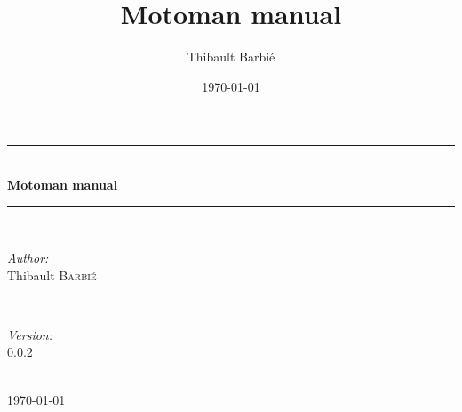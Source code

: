 \documentclass{book}
\title{Motoman manual}
\author{Thibault Barbié}
\date{\today}
\begin{document}
\begin{titlepage}
\newcommand{\HRule}{\rule{\linewidth}{0.5mm}}
\center

\HRule \\[1.5cm]
{ \huge \bfseries Motoman manual}\\[0.4cm] 
\HRule \\[1.5cm]

\begin{minipage}{0.4\textwidth}
\begin{flushleft} \large
\emph{Author:}\\
Thibault \textsc{Barbi\'{e}} %
\end{flushleft}
\end{minipage}
~
\begin{minipage}{0.4\textwidth}
\begin{flushright} \large
\emph{Version:}\\
0.0.2 
\end{flushright}
\end{minipage}\\[4cm]

{\large \today}\\[3cm] 
\vfill 

\end{titlepage}

\tableofcontents
\newpage






\end{document}
